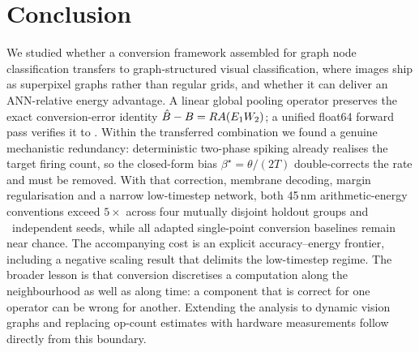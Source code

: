 \section{Conclusion}
\label{sec:conclusion}

We studied whether a conversion framework assembled for graph node classification transfers to graph-structured visual classification, where images ship as superpixel graphs rather than regular grids, and whether it can deliver an ANN-relative energy advantage. A linear global pooling operator preserves the exact conversion-error identity $\hat{B}-B=R A(E_1W_2)$; a unified float64 forward pass verifies it to \IdentityMax. Within the transferred combination we found a genuine mechanistic redundancy: deterministic two-phase spiking already realises the target firing count, so the closed-form bias $\beta^\star=\theta/(2T)$ double-corrects the rate and must be removed. With that correction, membrane decoding, margin regularisation and a narrow low-timestep network, both 45\,nm arithmetic-energy conventions exceed $5\times$ across four mutually disjoint holdout groups and \TotalSeeds\ independent seeds, while all adapted single-point conversion baselines remain near chance. The accompanying cost is an explicit accuracy--energy frontier, including a negative scaling result that delimits the low-timestep regime. The broader lesson is that conversion discretises a computation along the neighbourhood as well as along time: a component that is correct for one operator can be wrong for another. Extending the analysis to dynamic vision graphs and replacing op-count estimates with hardware measurements follow directly from this boundary.
